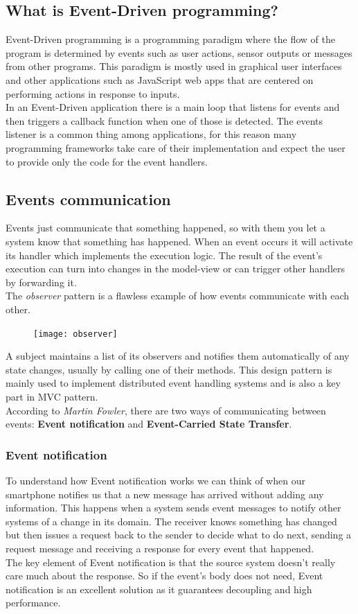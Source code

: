 \documentclass[11pt]{article} %
\begin{document}
\subsection{What is Event-Driven programming?}
Event-Driven programming is a programming paradigm where the flow of the program is determined by events such as user actions, sensor outputs or messages from other programs. This paradigm is mostly used in graphical user interfaces and other applications such as JavaScript web apps that are centered on performing actions in response to inputs. \\
In an Event-Driven application there is a main loop that listens for events and then triggers a callback function when one of those is detected. The events listener is a common thing among applications, for this reason many programming frameworks take care of their implementation and expect the user to provide only the code for the event handlers.

\subsection{Events communication}
Events just communicate that something happened, so with them you let a system know that something has happened. When an event occurs it will activate its handler which implements the execution logic. The result of the event's execution can turn into changes in the model-view or can trigger other handlers by forwarding it. \\
The \emph{observer} pattern is a flawless example of how events communicate with each other. 
\begin{figure} [H]
	\centering
	\texttt{[image: observer]}
\end{figure}
A subject maintains a list of its  observers and notifies them automatically of any state changes, usually by calling one of their methods.
This design pattern is mainly used to implement distributed event handling systems and is also a key part in MVC pattern.\\ 

According to \emph{Martin Fowler}, there are two ways of communicating between events: \textbf{Event notification} and \textbf{Event-Carried State Transfer}.

\subsubsection{Event notification}
To understand how Event notification works we can think of when our smartphone notifies us that a new message has arrived without adding any information. This happens when a system sends event messages to notify other systems of a change in its domain. The receiver knows something has changed but then issues a request back to the sender to decide what to do next, sending a request message and receiving a response for every event that happened. \\
The key element of Event notification is that the source system doesn't really care much about the response. So if the event's body does not need, Event notification is an excellent solution as it guarantees decoupling and high performance.
\end{document}
